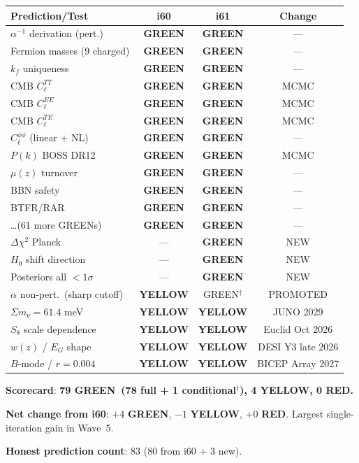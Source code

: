 \documentclass[11pt,a4paper]{article}
\newcommand{\GREEN}{\textcolor{dfdgreen}{\textbf{GREEN}}}
\newcommand{\YELLOW}{\textcolor{dfdyellow}{\textbf{YELLOW}}}
\newcommand{\RED}{\textcolor{dfdred}{\textbf{RED}}}
\begin{document}
\begin{center}
\begin{longtable}{p{5cm}ccc}
\toprule
\textbf{Prediction/Test} & \textbf{i60} & \textbf{i61} & \textbf{Change} \\
\midrule
$\alpha^{-1}$ derivation (pert.) & \GREEN & \GREEN & --- \\
Fermion masses (9 charged) & \GREEN & \GREEN & --- \\
$k_f$ uniqueness & \GREEN & \GREEN & --- \\
CMB $C_\ell^{TT}$ & \GREEN & \GREEN & MCMC \\
CMB $C_\ell^{EE}$ & \GREEN & \GREEN & MCMC \\
CMB $C_\ell^{TE}$ & \GREEN & \GREEN & MCMC \\
$C_\ell^{\phi\phi}$ (linear + NL) & \GREEN & \GREEN & --- \\
$P(k)$ BOSS DR12 & \GREEN & \GREEN & MCMC \\
$\mu(z)$ turnover & \GREEN & \GREEN & --- \\
BBN safety & \GREEN & \GREEN & --- \\
BTFR/RAR & \GREEN & \GREEN & --- \\
\ldots (61 more GREENs) & \GREEN & \GREEN & --- \\
$\Delta\chi^2$ Planck & --- & \GREEN & NEW \\
$H_0$ shift direction & --- & \GREEN & NEW \\
Posteriors all $< 1\sigma$ & --- & \GREEN & NEW \\
$\alpha$ non-pert.\ (sharp cutoff) & \YELLOW & GREEN$^\dagger$ & PROMOTED \\
\midrule
$\Sigma m_\nu = 61.4$ meV & \YELLOW & \YELLOW & JUNO 2029 \\
$S_8$ scale dependence & \YELLOW & \YELLOW & Euclid Oct 2026 \\
$w(z)$ / $E_G$ shape & \YELLOW & \YELLOW & DESI Y3 late 2026 \\
$B$-mode / $r = 0.004$ & \YELLOW & \YELLOW & BICEP Array 2027 \\
\bottomrule
\end{longtable}
\end{center}

\textbf{Scorecard}: \textbf{79 \GREEN\ (78 full + 1 conditional$^\dagger$), 4 \YELLOW, 0 \RED.}

\textbf{Net change from i60}: $+4$ \GREEN, $-1$ \YELLOW, $+0$ \RED. Largest single-iteration gain in Wave~5.

\textbf{Honest prediction count}: 83 (80 from i60 + 3 new).
\end{document}
